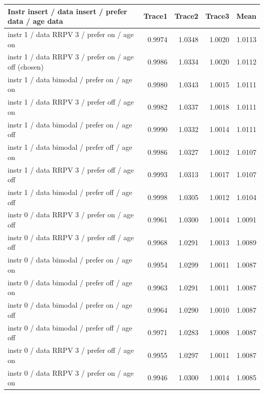 \begin{tabular}{lrrrr}\toprule
Instr insert / data insert / prefer data / age data & Trace1 & Trace2 & Trace3 & Mean \\ \midrule
instr 1 / data RRPV 3 / prefer on / age on & 0.9974 & 1.0348 & 1.0020 & 1.0113 \\
instr 1 / data RRPV 3 / prefer on / age off (chosen) & 0.9986 & 1.0334 & 1.0020 & 1.0112 \\
instr 1 / data bimodal / prefer on / age on & 0.9980 & 1.0343 & 1.0015 & 1.0111 \\
instr 1 / data RRPV 3 / prefer off / age on & 0.9982 & 1.0337 & 1.0018 & 1.0111 \\
instr 1 / data bimodal / prefer on / age off & 0.9990 & 1.0332 & 1.0014 & 1.0111 \\
instr 1 / data bimodal / prefer off / age on & 0.9986 & 1.0327 & 1.0012 & 1.0107 \\
instr 1 / data RRPV 3 / prefer off / age off & 0.9993 & 1.0313 & 1.0017 & 1.0107 \\
instr 1 / data bimodal / prefer off / age off & 0.9998 & 1.0305 & 1.0012 & 1.0104 \\
instr 0 / data RRPV 3 / prefer on / age off & 0.9961 & 1.0300 & 1.0014 & 1.0091 \\
instr 0 / data RRPV 3 / prefer off / age off & 0.9968 & 1.0291 & 1.0013 & 1.0089 \\
instr 0 / data bimodal / prefer on / age on & 0.9954 & 1.0299 & 1.0011 & 1.0087 \\
instr 0 / data bimodal / prefer off / age on & 0.9963 & 1.0291 & 1.0011 & 1.0087 \\
instr 0 / data bimodal / prefer on / age off & 0.9964 & 1.0290 & 1.0010 & 1.0087 \\
instr 0 / data bimodal / prefer off / age off & 0.9971 & 1.0283 & 1.0008 & 1.0087 \\
instr 0 / data RRPV 3 / prefer off / age on & 0.9955 & 1.0297 & 1.0011 & 1.0087 \\
instr 0 / data RRPV 3 / prefer on / age on & 0.9946 & 1.0300 & 1.0014 & 1.0085 \\
\bottomrule\end{tabular}
